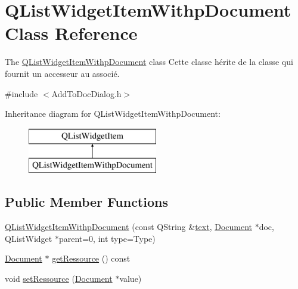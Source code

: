 \hypertarget{class_q_list_widget_item_withp_document}{\section{Q\-List\-Widget\-Item\-Withp\-Document Class Reference}
\label{class_q_list_widget_item_withp_document}
}


The \hyperlink{class_q_list_widget_item_withp_document}{Q\-List\-Widget\-Item\-Withp\-Document} class Cette classe hérite de la classe  qui fournit un accesseur au  associé.  




{\ttfamily \#include $<$Add\-To\-Doc\-Dialog.\-h$>$}

Inheritance diagram for Q\-List\-Widget\-Item\-Withp\-Document\-:\begin{figure}[H]
\begin{center}
\leavevmode
\includegraphics[height=2.000000cm]{class_q_list_widget_item_withp_document}
\end{center}
\end{figure}
\subsection*{Public Member Functions}
\begin{DoxyCompactItemize}
\item 
\hyperlink{class_q_list_widget_item_withp_document_a5f6d10507e98f8a36da9110ded0febf3}{Q\-List\-Widget\-Item\-Withp\-Document} (const Q\-String \&\hyperlink{_export_strategy_8h_a6bd23bde1932319c9832c0129a94b307a0e17259309839615d215adfe7a44fb50}{text}, \hyperlink{class_document}{Document} $\ast$doc, Q\-List\-Widget $\ast$parent=0, int type=Type)
\item 
\hyperlink{class_document}{Document} $\ast$ \hyperlink{class_q_list_widget_item_withp_document_ac69aeecc5fd9d96649ef0b177bff1e4c}{get\-Ressource} () const 
\item 
void \hyperlink{class_q_list_widget_item_withp_document_ae483b27659eb59348fdb470ed2938cb2}{set\-Ressource} (\hyperlink{class_document}{Document} $\ast$value)
\end{DoxyCompactItemize}


